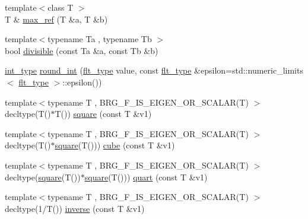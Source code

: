 \begin{DoxyCompactItemize}
\item 
{\footnotesize template$<$class T $>$ }\\T \& \hyperlink{namespaceIceBRG_a653dff34ed3915f793d34fd1e14126c0}{max\+\_\+ref} (T \&a, T \&b)
\item 
{\footnotesize template$<$typename Ta , typename Tb $>$ }\\bool \hyperlink{namespaceIceBRG_a9b71ab7234b6b6db9f6d292fe1ac4da8}{divisible} (const Ta \&a, const Tb \&b)
\item 
\hyperlink{lib_2IceBRG__main_2common_8h_ac4de9d9335536ac22821171deec8d39e}{int\+\_\+type} \hyperlink{namespaceIceBRG_a26b76a1dceee5e7c257d09c006a28b4b}{round\+\_\+int} (\hyperlink{lib_2IceBRG__main_2common_8h_ad0f130a56eeb944d9ef2692ee881ecc4}{flt\+\_\+type} value, const \hyperlink{lib_2IceBRG__main_2common_8h_ad0f130a56eeb944d9ef2692ee881ecc4}{flt\+\_\+type} \&epsilon=std\+::numeric\+\_\+limits$<$ \hyperlink{lib_2IceBRG__main_2common_8h_ad0f130a56eeb944d9ef2692ee881ecc4}{flt\+\_\+type} $>$\+::epsilon())
\item 
{\footnotesize template$<$typename T , B\+R\+G\+\_\+\+F\+\_\+\+I\+S\+\_\+\+E\+I\+G\+E\+N\+\_\+\+O\+R\+\_\+\+S\+C\+A\+L\+A\+R(\+T) $>$ }\\decltype(T()$\ast$T()) \hyperlink{namespaceIceBRG_acb41b216878b9fbfb640e4d952245454}{square} (const T \&v1)
\item 
{\footnotesize template$<$typename T , B\+R\+G\+\_\+\+F\+\_\+\+I\+S\+\_\+\+E\+I\+G\+E\+N\+\_\+\+O\+R\+\_\+\+S\+C\+A\+L\+A\+R(\+T) $>$ }\\decltype(T()$\ast$\hyperlink{namespaceIceBRG_acb41b216878b9fbfb640e4d952245454}{square}(T())) \hyperlink{namespaceIceBRG_a004e76de29014018d52a7e1960ec0379}{cube} (const T \&v1)
\item 
{\footnotesize template$<$typename T , B\+R\+G\+\_\+\+F\+\_\+\+I\+S\+\_\+\+E\+I\+G\+E\+N\+\_\+\+O\+R\+\_\+\+S\+C\+A\+L\+A\+R(\+T) $>$ }\\decltype(\hyperlink{namespaceIceBRG_acb41b216878b9fbfb640e4d952245454}{square}(T())$\ast$\hyperlink{namespaceIceBRG_acb41b216878b9fbfb640e4d952245454}{square}(T())) \hyperlink{namespaceIceBRG_ad2c9ac76b2a0e4b14e2a18374dc1cb22}{quart} (const T \&v1)
\item 
{\footnotesize template$<$typename T , B\+R\+G\+\_\+\+F\+\_\+\+I\+S\+\_\+\+E\+I\+G\+E\+N\+\_\+\+O\+R\+\_\+\+S\+C\+A\+L\+A\+R(\+T) $>$ }\\decltype(1/T()) \hyperlink{namespaceIceBRG_ab1443aa39081e660922881dd0d41f3f0}{inverse} (const T \&v1)
\item 

\end{DoxyCompactItemize}
